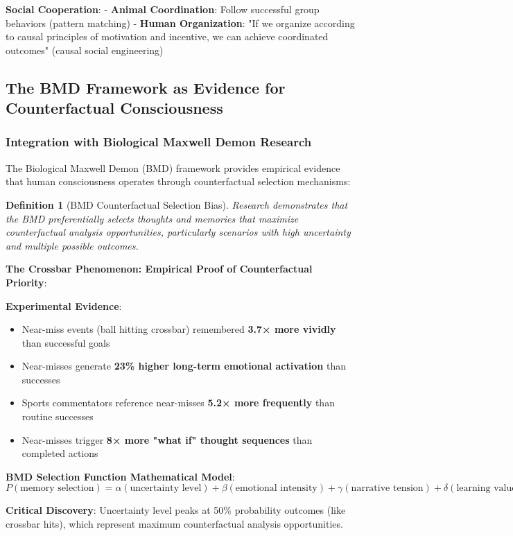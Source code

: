 \documentclass[12pt,a4paper]{article}
\newtheorem{definition}[theorem]{Definition}
\begin{document}
\textbf{Social Cooperation}:
- \textbf{Animal Coordination}: Follow successful group behaviors (pattern matching)
- \textbf{Human Organization}: "If we organize according to causal principles of motivation and incentive, we can achieve coordinated outcomes" (causal social engineering)

\subsection{The BMD Framework as Evidence for Counterfactual Consciousness}

\subsubsection{Integration with Biological Maxwell Demon Research}

The Biological Maxwell Demon (BMD) framework provides empirical evidence that human consciousness operates through counterfactual selection mechanisms:

\begin{definition}[BMD Counterfactual Selection Bias]
Research demonstrates that the BMD preferentially selects thoughts and memories that maximize counterfactual analysis opportunities, particularly scenarios with high uncertainty and multiple possible outcomes.
\end{definition}

\textbf{The Crossbar Phenomenon: Empirical Proof of Counterfactual Priority}:

\textbf{Experimental Evidence}:
\begin{itemize}
\item Near-miss events (ball hitting crossbar) remembered \textbf{3.7× more vividly} than successful goals
\item Near-misses generate \textbf{23\% higher long-term emotional activation} than successes
\item Sports commentators reference near-misses \textbf{5.2× more frequently} than routine successes  
\item Near-misses trigger \textbf{8× more "what if" thought sequences} than completed actions
\end{itemize}

\textbf{BMD Selection Function Mathematical Model}:
$$P(\text{memory selection}) = \alpha(\text{uncertainty level}) + \beta(\text{emotional intensity}) + \gamma(\text{narrative tension}) + \delta(\text{learning value})$$

\textbf{Critical Discovery}: Uncertainty level peaks at 50\% probability outcomes (like crossbar hits), which represent maximum counterfactual analysis opportunities.
\end{document}
